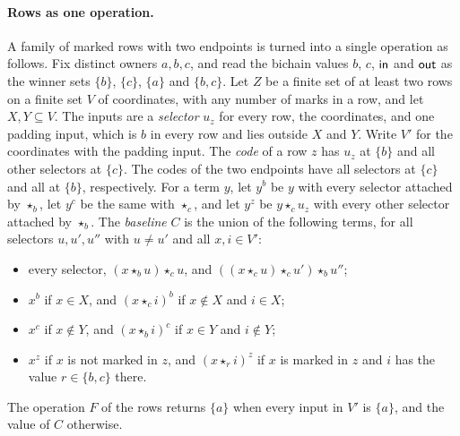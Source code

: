 \paragraph{Rows as one operation.}
A family of marked rows with two endpoints is turned into a single
operation as follows. Fix distinct owners $a,b,c$, and read the bichain
values $b$, $c$, $\mathsf{in}$ and $\mathsf{out}$ as the winner sets $\{b\}$, $\{c\}$,
$\{a\}$ and $\{b,c\}$. Let $Z$ be a finite set of at least two rows on a
finite set $V$ of coordinates, with any number of marks in a row, and let
$X,Y\subseteq V$. The inputs are a \emph{selector} $u_z$ for every row,
the coordinates, and one padding input, which is $b$ in every row and
lies outside $X$ and $Y$. Write $V'$ for the coordinates with the padding
input. The \emph{code} of a row $z$ has $u_z$ at $\{b\}$ and all other
selectors at $\{c\}$. The codes of the two endpoints have all selectors at
$\{c\}$ and all at $\{b\}$, respectively. For a term $y$, let $y^{b}$ be
$y$ with every selector attached by $\star_b$, let $y^{c}$ be the same
with $\star_c$, and let
$y^{z}$ be $y\star_cu_z$ with every other selector attached by $\star_b$.
The \emph{baseline} $C$ is the union of the following terms, for all
selectors $u,u',u''$ with $u\ne u'$ and all $x,i\in V'$:
\begin{itemize}
\item every selector, $(x\star_bu)\star_cu$, and
$((x\star_cu)\star_cu')\star_bu''$;
\item $x^{b}$ if $x\in X$, and $(x\star_ci)^{b}$ if $x\notin X$ and $i\in X$;
\item $x^{c}$ if $x\notin Y$, and $(x\star_bi)^{c}$ if $x\in Y$ and $i\notin Y$;
\item $x^{z}$ if $x$ is not marked in $z$, and $(x\star_ri)^{z}$ if $x$ is
marked in $z$ and $i$ has the value $r\in\{b,c\}$ there.
\end{itemize}
The operation $F$ of the rows returns $\{a\}$ when every input in $V'$ is
$\{a\}$, and the value of $C$ otherwise.

